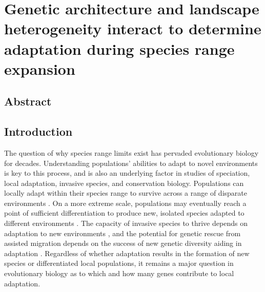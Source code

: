 \chapter{Genetic architecture and landscape heterogeneity interact to determine adaptation during species range expansion}%
\label{chap:heterogeneouslandscapes}

\section{Abstract}


\section{Introduction}




The question of why species range limits exist has pervaded evolutionary biology for decades. Understanding populations' abilities to adapt to novel environments is key to this process, and is also an underlying factor in studies of speciation, local adaptation, invasive species, and conservation biology. 
Populations can locally adapt within their species range to survive across a range of disparate environments \citep{Kawecki:2004}. On a more extreme scale, populations may eventually reach a point of sufficient differentiation to produce new, isolated species adapted to different environments \citep{Rundle:2005, Doebeli:2003}. The capacity of invasive species to thrive depends on adaptation to new environments \citep{Prentis:2008}, and the potential for genetic rescue from assisted migration depends on the success of new genetic diversity aiding in adaptation \citep{Aitken:2013}. 
Regardless of whether adaptation results in the formation of new species or differentiated local populations, it remains a major question in evolutionary biology as to which and how many genes contribute to local adaptation. 


